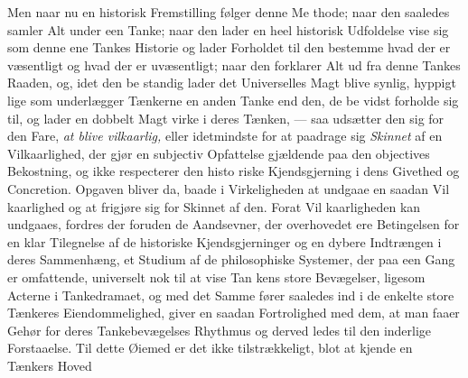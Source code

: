 Men naar nu en historisk Fremstilling følger denne Me\-%
thode; naar den saaledes samler Alt under een Tanke; naar
den lader en heel historisk Udfoldelse vise sig som denne
ene Tankes Historie og lader Forholdet til den bestemme
hvad der er væsentligt og hvad der er uvæsentligt; naar den
forklarer Alt ud fra denne Tankes Raaden, og, idet den be\-%
standig lader det Universelles Magt blive synlig, hyppigt lige\-%
som underlægger Tænkerne en anden Tanke end den, de be\-%
vidst forholde sig til, og lader en dobbelt Magt virke i deres
Tænken, --- saa udsætter den sig for den Fare, \emph{at blive
vilkaarlig,} eller idetmindste for at paadrage sig \emph{Skinnet}
af en Vilkaarlighed, der gjør en subjectiv Opfattelse gjældende
paa den objectives Bekostning, og ikke respecterer den histo\-%
riske Kjendsgjerning i dens Givethed og Concretion. Opgaven
bliver da, baade i Virkeligheden at undgaae en saadan Vil\-%
kaarlighed og at frigjøre sig for Skinnet af den. Forat Vil\-%
kaarligheden kan undgaaes, fordres der foruden de Aandsevner,
der overhovedet ere Betingelsen for en klar Tilegnelse af de
historiske Kjendsgjerninger og en dybere Indtrængen i deres
Sammenhæng, et Studium af de philosophiske Systemer, der
paa een Gang er omfattende, universelt nok til at vise Tan\-%
kens store Bevægelser, ligesom Acterne i Tankedramaet, og
med det Samme fører saaledes ind i de enkelte store Tænkeres
Eiendommelighed, giver en saadan Fortrolighed med dem, at
man faaer Gehør for deres Tankebevægelses Rhythmus og
derved ledes til den inderlige Forstaaelse. Til dette Øiemed
er det ikke tilstrækkeligt, blot at kjende en Tænkers Hoved\-%
